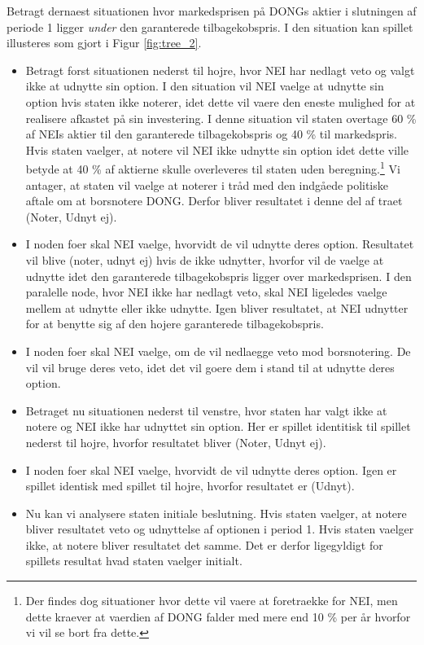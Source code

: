 \documentclass{article}
\begin{document}
Betragt dernaest situationen hvor markedsprisen på DONGs aktier i slutningen af periode 1 ligger \textit{under} den garanterede tilbagekobspris. I den situation kan spillet illusteres som gjort i Figur \ref{fig:tree_2}.

\begin{itemize}

	\item Betragt forst situationen nederst til hojre, hvor NEI har nedlagt veto og valgt ikke at udnytte sin option. I den situation vil NEI vaelge at udnytte sin option hvis staten ikke noterer, idet dette vil vaere den eneste mulighed for at realisere afkastet på sin investering. I denne situation vil staten overtage 60 \% af NEIs aktier til den garanterede tilbagekobspris og 40 \% til markedspris. Hvis staten vaelger, at notere vil NEI ikke udnytte sin option idet dette ville betyde at 40 \% af aktierne skulle overleveres til staten uden beregning.\footnote{Der findes dog situationer hvor dette vil vaere at foretraekke for NEI, men dette kraever at vaerdien af DONG falder med mere end 10 \% per år hvorfor vi vil se bort fra dette.} Vi antager, at staten vil vaelge at noterer i tråd med den indgåede politiske aftale om at borsnotere DONG. Derfor bliver resultatet i denne del af traet (Noter, Udnyt ej).
	
		\item I noden foer skal NEI vaelge, hvorvidt de vil udnytte deres option. Resultatet vil blive (noter, udnyt ej) hvis de ikke udnytter, hvorfor vil de vaelge at udnytte idet den garanterede tilbagekobspris ligger over markedsprisen. I den paralelle node, hvor NEI ikke har nedlagt veto, skal NEI ligeledes vaelge mellem at udnytte eller ikke udnytte. Igen bliver resultatet, at NEI udnytter for at benytte sig af den hojere garanterede tilbagekobspris.
		
		\item I noden foer skal NEI vaelge, om de vil nedlaegge veto mod borsnotering. De vil vil bruge deres veto, idet det vil goere dem i stand til at udnytte deres option.
		
			\item Betraget nu situationen nederst til venstre, hvor staten har valgt ikke at notere og NEI ikke har udnyttet sin option. Her er spillet identitisk til spillet nederst til hojre, hvorfor resultatet bliver (Noter, Udnyt ej).
		
			\item I noden foer skal NEI vaelge, hvorvidt de vil udnytte deres option. Igen er spillet identisk med spillet til hojre, hvorfor resultatet er (Udnyt). 
		
			\item Nu kan vi analysere staten initiale beslutning. Hvis staten vaelger, at notere bliver resultatet veto og udnyttelse af optionen i period 1. Hvis staten vaelger ikke, at notere bliver resultatet det samme. Det er derfor ligegyldigt for spillets resultat hvad staten vaelger initialt. 
			
\end{itemize}
\end{document}
